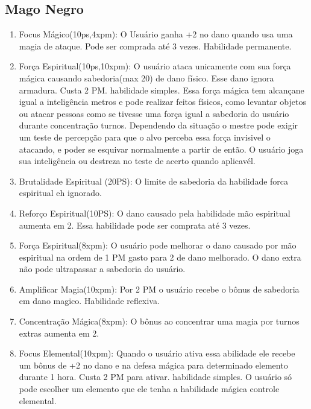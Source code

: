  \subsection{Mago Negro}
 
 
\begin{enumerate}

	\item Focus Mágico(10ps,4xpm): O Usuário ganha +2 no dano quando usa uma magia de ataque. Pode ser comprada até 3 vezes. Habilidade permanente.
 
 	\item Força Espiritual(10ps,10xpm): O usuário ataca unicamente com sua força mágica causando sabedoria(max 20) de dano físico. Esse dano ignora armadura. Custa 2 PM. habilidade simples. Essa força mágica tem alcançane igual a inteligência metros e pode realizar feitos físicos, como levantar objetos ou atacar pessoas como se tivesse uma força igual a sabedoria do usuário durante concentração turnos. Dependendo da situação o mestre pode exigir um teste de percepção para que o alvo perceba essa força invisivel o atacando, e poder se esquivar normalmente a partir de então. O usuário joga sua inteligência ou destreza no teste de acerto quando aplicavél. 

 	\item Brutalidade Espiritual (20PS): O limite de sabedoria da habilidade forca espiritual eh ignorado.
 	
	 	
 	\item Reforço Espiritual(10PS): O dano causado pela habilidade mão espiritual aumenta em 2. Essa habilidade pode ser comprata até 3 vezes.
 	
 	\item Força Espiritual(8xpm): O usuário pode melhorar o dano causado por mão espiritual na ordem de 1 PM gasto para 2 de dano melhorado. O dano extra não pode ultrapassar a sabedoria do usuário.
 
 	\item Amplificar Magia(10xpm): Por 2 PM o usuário recebe o bônus de sabedoria em dano magico. Habilidade reflexiva.
 	
 	\item Concentração Mágica(8xpm): O bônus ao concentrar uma magia por turnos extras aumenta em 2.
 	
 	\item Focus Elemental(10xpm): Quando o usuário ativa essa abilidade ele recebe um bônus de +2 no dano e na defesa mágica para determinado elemento durante 1 hora. Custa 2 PM para ativar. habilidade simples. O usuário só pode escolher um elemento que ele tenha a habilidade mágica controle elemental.
 	

\end{enumerate}
